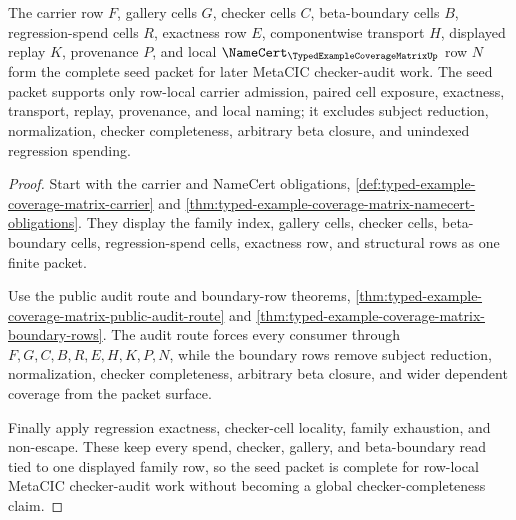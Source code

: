 \begin{theorem}
\label{thm:typed-example-coverage-matrix-seed-readiness}
The carrier row $F$, gallery cells $G$, checker cells $C$, beta-boundary cells $B$, regression-spend cells $R$, exactness row $E$, componentwise transport $H$, displayed replay $K$, provenance $P$, and local $\NameCert_{\TypedExampleCoverageMatrixUp}$ row $N$ form the complete seed packet for later MetaCIC checker-audit work. The seed packet supports only row-local carrier admission, paired cell exposure, exactness, transport, replay, provenance, and local naming; it excludes subject reduction, normalization, checker completeness, arbitrary beta closure, and unindexed regression spending.
\end{theorem}
\begin{proof}
Start with the carrier and NameCert obligations, \autoref{def:typed-example-coverage-matrix-carrier} and \autoref{thm:typed-example-coverage-matrix-namecert-obligations}. They display the family index, gallery cells, checker cells, beta-boundary cells, regression-spend cells, exactness row, and structural rows as one finite packet.

Use the public audit route and boundary-row theorems, \autoref{thm:typed-example-coverage-matrix-public-audit-route} and \autoref{thm:typed-example-coverage-matrix-boundary-rows}. The audit route forces every consumer through $F,G,C,B,R,E,H,K,P,N$, while the boundary rows remove subject reduction, normalization, checker completeness, arbitrary beta closure, and wider dependent coverage from the packet surface.

Finally apply regression exactness, checker-cell locality, family exhaustion, and non-escape. These keep every spend, checker, gallery, and beta-boundary read tied to one displayed family row, so the seed packet is complete for row-local MetaCIC checker-audit work without becoming a global checker-completeness claim.
\end{proof}

